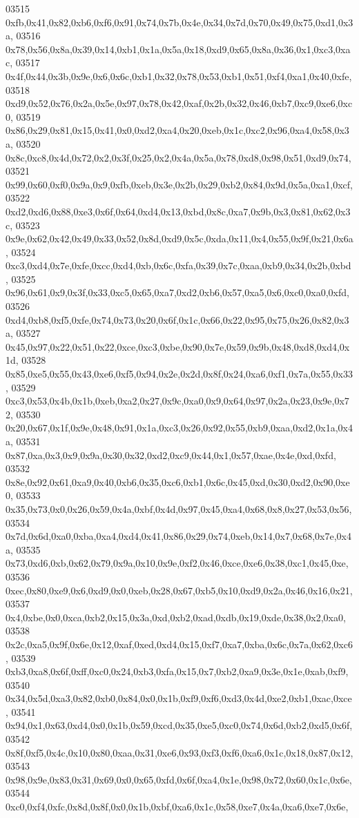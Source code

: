 \begin{DoxyCode}
03515   0xfb,0x41,0x82,0xb6,0xf6,0x91,0x74,0x7b,0x4e,0x34,0x7d,0x70,0x49,0x75,0xd1,0x3a,
03516   0x78,0x56,0x8a,0x39,0x14,0xb1,0x1a,0x5a,0x18,0xd9,0x65,0x8a,0x36,0x1,0xc3,0xac,
03517   0x4f,0x44,0x3b,0x9e,0x6,0x6c,0xb1,0x32,0x78,0x53,0xb1,0x51,0xf4,0xa1,0x40,0xfe,
03518   0xd9,0x52,0x76,0x2a,0x5e,0x97,0x78,0x42,0xaf,0x2b,0x32,0x46,0xb7,0xc9,0xe6,0xc0,
03519   0x86,0x29,0x81,0x15,0x41,0x0,0xd2,0xa4,0x20,0xeb,0x1c,0xc2,0x96,0xa4,0x58,0x3a,
03520   0x8c,0xc8,0x4d,0x72,0x2,0x3f,0x25,0x2,0x4a,0x5a,0x78,0xd8,0x98,0x51,0xd9,0x74,
03521   0x99,0x60,0xf0,0x9a,0x9,0xfb,0xeb,0x3e,0x2b,0x29,0xb2,0x84,0x9d,0x5a,0xa1,0xcf,
03522   0xd2,0xd6,0x88,0xe3,0x6f,0x64,0xd4,0x13,0xbd,0x8c,0xa7,0x9b,0x3,0x81,0x62,0x3c,
03523   0x9e,0x62,0x42,0x49,0x33,0x52,0x8d,0xd9,0x5c,0xda,0x11,0x4,0x55,0x9f,0x21,0x6a,
03524   0xc3,0xd4,0x7e,0xfe,0xcc,0xd4,0xb,0x6c,0xfa,0x39,0x7c,0xaa,0xb9,0x34,0x2b,0xbd,
03525   0x96,0x61,0x9,0x3f,0x33,0xc5,0x65,0xa7,0xd2,0xb6,0x57,0xa5,0x6,0xc0,0xa0,0xfd,
03526   0xd4,0xb8,0xf5,0xfe,0x74,0x73,0x20,0x6f,0x1c,0x66,0x22,0x95,0x75,0x26,0x82,0x3a,
03527   0x45,0x97,0x22,0x51,0x22,0xce,0xc3,0xbe,0x90,0x7e,0x59,0x9b,0x48,0xd8,0xd4,0x1d,
03528   0x85,0xe5,0x55,0x43,0xe6,0xf5,0x94,0x2e,0x2d,0x8f,0x24,0xa6,0xf1,0x7a,0x55,0x33,
03529   0xc3,0x53,0x4b,0x1b,0xeb,0xa2,0x27,0x9c,0xa0,0x9,0x64,0x97,0x2a,0x23,0x9e,0x72,
03530   0x20,0x67,0x1f,0x9e,0x48,0x91,0x1a,0xc3,0x26,0x92,0x55,0xb9,0xaa,0xd2,0x1a,0x4a,
03531   0x87,0xa,0x3,0x9,0x9a,0x30,0x32,0xd2,0xc9,0x44,0x1,0x57,0xae,0x4e,0xd,0xfd,
03532   0x8e,0x92,0x61,0xa9,0x40,0xb6,0x35,0xc6,0xb1,0x6c,0x45,0xd,0x30,0xd2,0x90,0xe0,
03533   0x35,0x73,0x0,0x26,0x59,0x4a,0xbf,0x4d,0x97,0x45,0xa4,0x68,0x8,0x27,0x53,0x56,
03534   0x7d,0x6d,0xa0,0xba,0xa4,0xd4,0x41,0x86,0x29,0x74,0xeb,0x14,0x7,0x68,0x7e,0x4a,
03535   0x73,0xd6,0xb,0x62,0x79,0x9a,0x10,0x9e,0xf2,0x46,0xce,0xe6,0x38,0xc1,0x45,0xe,
03536   0xec,0x80,0xe9,0x6,0xd9,0x0,0xeb,0x28,0x67,0xb5,0x10,0xd9,0x2a,0x46,0x16,0x21,
03537   0x4,0xbe,0x0,0xca,0xb2,0x15,0x3a,0xd,0xb2,0xad,0xdb,0x19,0xde,0x38,0x2,0xa0,
03538   0x2c,0xa5,0x9f,0x6e,0x12,0xaf,0xed,0xd4,0x15,0xf7,0xa7,0xba,0x6c,0x7a,0x62,0xc6,
03539   0xb3,0xa8,0x6f,0xff,0xc0,0x24,0xb3,0xfa,0x15,0x7,0xb2,0xa9,0x3e,0x1e,0xab,0xf9,
03540   0x34,0x5d,0xa3,0x82,0xb0,0x84,0x0,0x1b,0xf9,0xf6,0xd3,0x4d,0xe2,0xb1,0xac,0xce,
03541   0x94,0x1,0x63,0xd4,0x0,0x1b,0x59,0xcd,0x35,0xe5,0xc0,0x74,0x6d,0xb2,0xd5,0x6f,
03542   0x8f,0xf5,0x4c,0x10,0x80,0xaa,0x31,0xe6,0x93,0xf3,0xf6,0xa6,0x1c,0x18,0x87,0x12,
03543   0x98,0x9e,0x83,0x31,0x69,0x0,0x65,0xfd,0x6f,0xa4,0x1e,0x98,0x72,0x60,0x1c,0x6e,
03544   0xc0,0xf4,0xfc,0x8d,0x8f,0x0,0x1b,0xbf,0xa6,0x1c,0x58,0xe7,0x4a,0xa6,0xe7,0x6e,

\end{DoxyCode}
